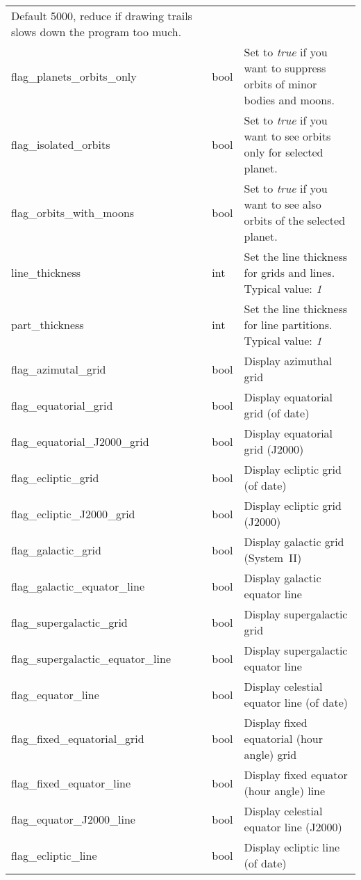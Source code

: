 \begin{longtable}{l|l|p{77mm}}
                                       Default 5000, reduce if drawing trails slows down the program too much.\\
flag\_planets\_orbits\_only   & bool & Set to \emph{true} if you want to suppress orbits of minor bodies and moons.\\
flag\_isolated\_orbits        & bool & Set to \emph{true} if you want to see orbits only for selected planet.\\
flag\_orbits\_with\_moons     & bool & Set to \emph{true} if you want to see also orbits of the selected planet.\\\midrule
line\_thickness               & int  & Set the line thickness for grids and lines. Typical value: \emph{1}\\%
part\_thickness               & int  & Set the line thickness for line partitions. Typical value: \emph{1}\\\midrule
flag\_azimutal\_grid          & bool & Display azimuthal grid \\%
flag\_equatorial\_grid        & bool & Display equatorial grid (of date) \\%
flag\_equatorial\_J2000\_grid & bool & Display equatorial grid (J2000) \\%
flag\_ecliptic\_grid          & bool & Display ecliptic grid (of date) \\%
flag\_ecliptic\_J2000\_grid   & bool & Display ecliptic grid (J2000) \\%
flag\_galactic\_grid          & bool & Display galactic grid (System~II)\\%
flag\_galactic\_equator\_line & bool & Display galactic equator line \\%
flag\_supergalactic\_grid          & bool & Display supergalactic grid\\%
flag\_supergalactic\_equator\_line & bool & Display supergalactic equator line \\%
flag\_equator\_line           & bool & Display celestial equator line (of date) \\%
flag\_fixed\_equatorial\_grid & bool & Display fixed equatorial (hour angle) grid \\%
flag\_fixed\_equator\_line    & bool & Display fixed equator (hour angle) line\\%
flag\_equator\_J2000\_line    & bool & Display celestial equator line (J2000) \\%
flag\_ecliptic\_line          & bool & Display ecliptic line (of date) \\%

\end{longtable}

